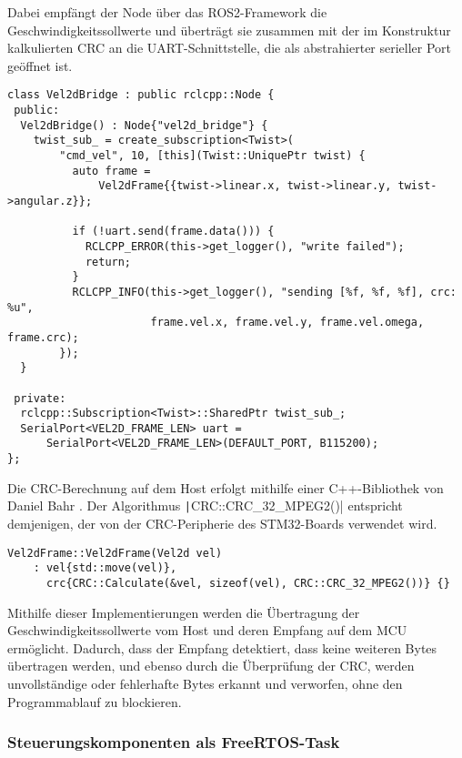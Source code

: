 Dabei empfängt der Node über das ROS2-Framework die Geschwindigkeitssollwerte
und überträgt sie zusammen mit der im Konstruktur kalkulierten CRC an die
UART-Schnittstelle, die als abstrahierter serieller Port geöffnet ist.

\begin{code}
\begin{verbatim}
class Vel2dBridge : public rclcpp::Node {
 public:
  Vel2dBridge() : Node{"vel2d_bridge"} {
    twist_sub_ = create_subscription<Twist>(
        "cmd_vel", 10, [this](Twist::UniquePtr twist) {
          auto frame =
              Vel2dFrame{{twist->linear.x, twist->linear.y, twist->angular.z}};

          if (!uart.send(frame.data())) {
            RCLCPP_ERROR(this->get_logger(), "write failed");
            return;
          }
          RCLCPP_INFO(this->get_logger(), "sending [%f, %f, %f], crc: %u",
                      frame.vel.x, frame.vel.y, frame.vel.omega, frame.crc);
        });
  }

 private:
  rclcpp::Subscription<Twist>::SharedPtr twist_sub_;
  SerialPort<VEL2D_FRAME_LEN> uart =
      SerialPort<VEL2D_FRAME_LEN>(DEFAULT_PORT, B115200);
};
\end{verbatim}
\end{code}

Die CRC-Berechnung auf dem Host erfolgt mithilfe einer C++-Bibliothek von Daniel
Bahr \cite{CRCpp}. Der Algorithmus \texttt|CRC::CRC_32_MPEG2()|
entspricht demjenigen, der von der CRC-Peripherie des STM32-Boards verwendet
wird.

\begin{code}
\begin{verbatim}
Vel2dFrame::Vel2dFrame(Vel2d vel)
    : vel{std::move(vel)},
      crc{CRC::Calculate(&vel, sizeof(vel), CRC::CRC_32_MPEG2())} {}
\end{verbatim}
\end{code}

Mithilfe dieser Implementierungen werden die Übertragung der
Geschwindigkeitssollwerte vom Host und deren Empfang auf dem MCU ermöglicht.
Dadurch, dass der Empfang detektiert, dass keine weiteren Bytes übertragen
werden, und ebenso durch die Überprüfung der CRC, werden unvollständige oder
fehlerhafte Bytes erkannt und verworfen, ohne den Programmablauf zu blockieren.

\subsubsection{Steuerungskomponenten als FreeRTOS-Task}

